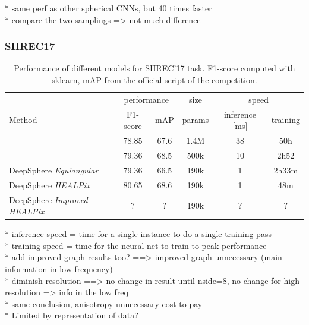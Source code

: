 \documentclass{article} %
\begin{document}
* same perf as other spherical CNNs, but 40 times faster \\
* compare the two samplings => not much difference \\

\subsubsection*{SHREC17}

\begin{table}[ht]
    \centering
    \begin{tabular}{l|c c c c c}
        \multicolumn{1}{l}{} & \multicolumn{2}{c}{performance} & \multicolumn{1}{c}{size} & \multicolumn{2}{c}{speed}\\
        \cmidrule(lr){2-3} \cmidrule(lr){4-4} \cmidrule(lr){5-6}
        \multicolumn{1}{l}{Method} & F1-score & mAP & params & inference [ms] & training \\ \hline
        \cite{cohen_spherical_2018} & 78.85 & 67.6 & 1.4M & 38 & 50h\\
        \cite{esteves_learning_2017} & 79.36 & 68.5 & 500k & 10 & 2h52\\ \hline
        DeepSphere \emph{Equiangular} & 79.36 & 66.5 & 190k & 1 & 2h33m \\
        DeepSphere \emph{HEALPix} & 80.65 & 68.6 & 190k & 1 & 48m\\
        DeepSphere \emph{Improved HEALPix} & ? & ? & 190k & ? & ?
    \end{tabular}
    \caption{Performance of different models for SHREC'17 task. F1-score computed with sklearn, mAP from the official script of the competition.}
    \label{tab:SHREC17_class}
\end{table}

* inference speed = time for a single instance to do a single training pass\\
* training speed = time for the neural net to train to peak performance\\

* add improved graph results too? ==> improved graph unnecessary (main information in low frequency) \\
* diminish resolution ==> no change in result until nside=8, no change for high resolution => info in the low freq\\
* same conclusion, anisotropy unnecessary cost to pay\\
* Limited by representation of data?\\
\end{document}

